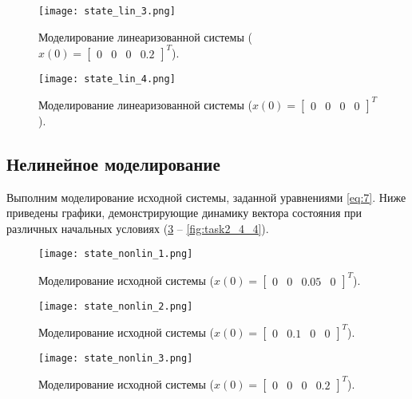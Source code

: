 \begin{figure}[]
    \centering
    \texttt{[image: state\_lin\_3.png]}
    \caption{\label{fig:task2_3_3}Моделирование линеаризованной системы ($x(0)=\begin{bmatrix}
        0 & 0 & 0 & 0.2
    \end{bmatrix}^T$).}
\end{figure}

\begin{figure}[]
    \centering
    \texttt{[image: state\_lin\_4.png]}
    \caption{\label{fig:task2_3_4}Моделирование линеаризованной системы ($x(0)=\begin{bmatrix}
        0 & 0 & 0 & 0
    \end{bmatrix}^T$).}
\end{figure}

\subsection{Нелинейное моделирование}
Выполним моделирование исходной системы, заданной уравнениями \ref{eq:7}.
Ниже приведены графики, демонстрирующие динамику вектора состояния при различных начальных условиях (\ref{fig:task2_4_1} -- \ref{fig:task2_4_4}).

\begin{figure}[]
    \centering
    \texttt{[image: state\_nonlin\_1.png]}
    \caption{\label{fig:task2_4_1}Моделирование исходной системы ($x(0)=\begin{bmatrix}
        0 & 0 & 0.05 & 0
    \end{bmatrix}^T$).}
\end{figure}

\begin{figure}[]
    \centering
    \texttt{[image: state\_nonlin\_2.png]}
    \caption{\label{fig:task2_4_2}Моделирование исходной системы ($x(0)=\begin{bmatrix}
        0 & 0.1 & 0 & 0
    \end{bmatrix}^T$).}
\end{figure}

\begin{figure}[]
    \centering
    \texttt{[image: state\_nonlin\_3.png]}
    \caption{\label{fig:task2_4_3}Моделирование исходной системы ($x(0)=\begin{bmatrix}
        0 & 0 & 0 & 0.2
    \end{bmatrix}^T$).}
\end{figure}

